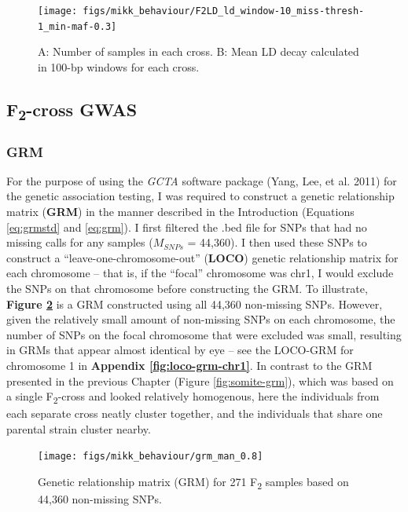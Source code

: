 \documentclass[
]{book}
\begin{document}
\begin{figure}
\texttt{[image: figs/mikk\_behaviour/F2LD\_ld\_window-10\_miss-thresh-1\_min-maf-0.3]} \caption{A: Number of samples in each cross. B: Mean LD decay calculated in 100-bp windows for each cross.}\label{fig:F2-LD-decay}
\end{figure}

\hypertarget{f2-cross-gwas}{%
\subsection{\texorpdfstring{F\textsubscript{2}-cross GWAS}{F2-cross GWAS}}\label{f2-cross-gwas}}

\hypertarget{grm}{%
\subsubsection{GRM}\label{grm}}

For the purpose of using the \emph{GCTA} software package (Yang, Lee, et al. 2011) for the genetic association testing, I was required to construct a genetic relationship matrix (\textbf{GRM}) in the manner described in the Introduction (Equations \eqref{eq:grmstd} and \eqref{eq:grm}). I first filtered the .bed file for SNPs that had no missing calls for any samples (\(M_{SNPs}\) = 44,360). I then used these SNPs to construct a ``leave-one-chromosome-out'' (\textbf{LOCO}) genetic relationship matrix for each chromosome -- that is, if the ``focal'' chromosome was chr1, I would exclude the SNPs on that chromosome before constructing the GRM. To illustrate, \textbf{Figure \ref{fig:F2-grm}} is a GRM constructed using all 44,360 non-missing SNPs. However, given the relatively small amount of non-missing SNPs on each chromosome, the number of SNPs on the focal chromosome that were excluded was small, resulting in GRMs that appear almost identical by eye -- see the LOCO-GRM for chromosome 1 in \textbf{Appendix \ref{fig:loco-grm-chr1}}. In contrast to the GRM presented in the previous Chapter (Figure \ref{fig:somite-grm}), which was based on a single F\textsubscript{2}-cross and looked relatively homogenous, here the individuals from each separate cross neatly cluster together, and the individuals that share one parental strain cluster nearby.



\begin{figure}
\texttt{[image: figs/mikk\_behaviour/grm\_man\_0.8]} \caption{Genetic relationship matrix (GRM) for 271 F\textsubscript{2} samples based on 44,360 non-missing SNPs.}\label{fig:F2-grm}
\end{figure}
\end{document}

